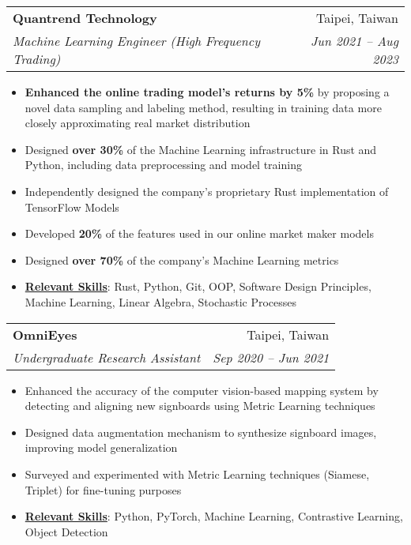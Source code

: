 \documentclass[letterpaper,11pt]{article}
\makeatletter
\newcommand{\resumeItem}[1]{
\item\small{
    {#1 \vspace{-2pt}}
  }
}
\newcommand{\resumeSubheading}[4]{
  \vspace{-2pt}
\item
  \begin{tabular*}{0.97\textwidth}[t]{l@{\extracolsep{\fill}}r}
    \textbf{#1} & #2 \\
    \textit{\small#3} & \textit{\small #4} \\
  \end{tabular*}\vspace{-7pt}
}
\newcommand{\resumeSubSubheading}[2]{
\item
  \begin{tabular*}{0.97\textwidth}{l@{\extracolsep{\fill}}r}
    \textit{\small#1} & \textit{\small #2} \\
  \end{tabular*}\vspace{-7pt}
}
\newcommand{\resumeSubHeadingListEnd}{
  \end{itemize}}
\newcommand{\resumeItemListStart}{
\begin{itemize}}
\newcommand{\resumeItemListEnd}{
  \end{itemize}\vspace{-5pt}}
\makeatother
\begin{document}


\resumeSubheading
{Quantrend Technology}{Taipei, Taiwan}
{Machine Learning Engineer (High Frequency Trading)}{Jun 2021 -- Aug 2023}
\resumeItemListStart
\resumeItem{\textbf{Enhanced the online trading model's returns by
  5\%} by proposing a novel data sampling and labeling method, resulting
in training data more closely approximating real market distribution}
\resumeItem{Designed \textbf{over 30\%} of the Machine Learning
  infrastructure in Rust and Python, including data preprocessing and
model training}
\resumeItem{Independently designed the company's proprietary Rust
implementation of TensorFlow Models}
\resumeItem{Developed \textbf{20\%} of the features used in our
online market maker models}
\resumeItem{Designed \textbf{over 70\%} of the company's Machine
Learning metrics}
\resumeItem{\textbf{\underline{Relevant Skills}}:
  Rust, Python, Git, OOP, Software Design Principles, Machine
  Learning, Linear Algebra, Stochastic Processes
}
\resumeItemListEnd

\resumeSubheading
{OmniEyes}{Taipei, Taiwan}
{Undergraduate Research Assistant}{Sep 2020 -- Jun 2021}
\resumeItemListStart
\resumeItem{Enhanced the accuracy of the computer vision-based mapping system by
detecting and aligning new signboards using Metric Learning techniques}
\resumeItem{Designed data augmentation mechanism to synthesize
signboard images, improving model generalization}
\resumeItem{Surveyed and experimented with Metric Learning techniques
(Siamese, Triplet) for fine-tuning purposes}
\resumeItem{\textbf{\underline{Relevant Skills}}:
  Python, PyTorch, Machine Learning, Contrastive Learning, Object Detection
}
\resumeItemListEnd
\end{document}
